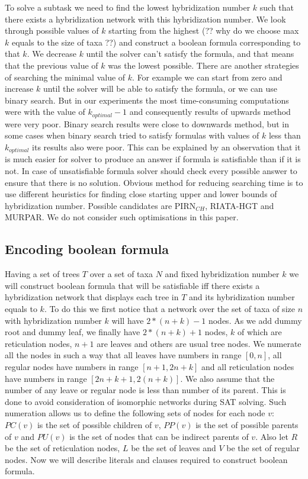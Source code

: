 \documentclass[runningheads, envcountsame, a4paper]{llncs}
\begin{document}
To solve a subtask we need to find the lowest hybridization number $k$ such that there exists a hybridization 
network with this hybridization number. We look through possible values of $k$ starting from the highest (?? why do 
we choose max $k$ equals to the size of taxa ??) and construct a boolean formula corresponding to that $k$. 
We decrease $k$ until the solver can't satisfy the formula, and that means that the previous value of $k$ was the 
lowest possible. There are another strategies of searching the minimal value of $k$. For example we can start from 
zero and increase $k$ until the solver will be able to satisfy the formula, or we can use binary search. But in our 
experiments the most time-consuming computations were with the value of $k_{optimal} - 1$ and consequently results of 
upwards method were very poor. Binary search results were close to downwards method, but in some cases when binary search 
tried to satisfy formulas with values of $k$ less than $k_{optimal}$ its results also were poor. This can be explained by 
an observation that it is much easier for solver to produce an answer if formula is satisfiable than if it is not. In case 
of unsatisfiable formula solver should check every possible answer to ensure that there is no solution. Obvious method 
for reducing searching time is to use different heuristics for finding close starting upper and lower bounds of 
hybridization number. Possible candidates are PIRN$_{CH}$, RIATA-HGT and MURPAR. We do not consider such optimisations in this paper.

\subsection{Encoding boolean formula}

Having a set of trees $T$ over a set of taxa $N$ and fixed hybridization number $k$ we will construct boolean formula 
that will be satisfiable iff there exists a hybridization network that displays each tree in $T$ and its hybridization 
number equals to $k$. To do this we first notice that a network over the set of taxa of size $n$ with hybridization number 
$k$ will have $2 * (n + k) - 1$ nodes. As we add dummy root and dummy leaf, we finally have $2 * (n + k) + 1$ nodes, 
$k$ of which are reticulation nodes, $n + 1$ are leaves and others are usual tree nodes. We numerate all the nodes in such a way 
that all leaves have numbers in range $[0,n]$, all regular nodes have numbers in range $[n + 1,2n + k]$ and all reticulation nodes have numbers 
in range $[2n + k + 1, 2(n + k)]$. We also assume that the number of any leave or regular node is less than number of its parent. This is done to 
avoid consideration of isomorphic networks during SAT solving. Such numeration allows us to define the following sets of nodes for each node 
$v$: $PC(v)$ is the set of possible children of $v$, $PP(v)$ is the set of possible parents of $v$ and $PU(v)$ is the set of nodes that can 
be indirect parents of $v$. Also let $R$ be the set of reticulation nodes, $L$ be the set of leaves and $V$ be the set of regular nodes. 
Now we will describe literals and clauses required to construct boolean formula.
\end{document}
